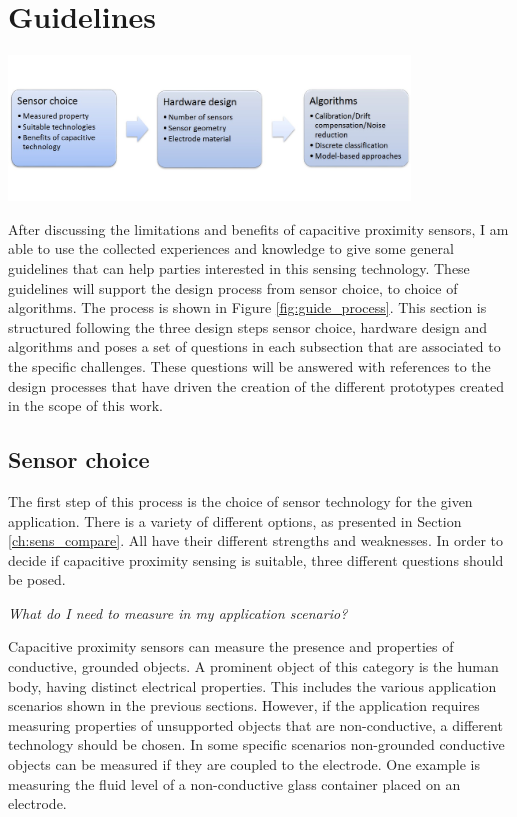 \section{Guidelines}
\begin{minipage}{\linewidth}
\centering
\includegraphics[width=0.8\textwidth]{images/guide_process}
\label{fig:guide_process}
\end{minipage}

After discussing the limitations and benefits of capacitive proximity sensors, I am able to use the collected experiences and knowledge to give some general guidelines that can help parties interested in this sensing technology. These guidelines will support the design process from sensor choice, to choice of algorithms. The process is shown in Figure \ref{fig:guide_process}. This section is structured following the three design steps sensor choice, hardware design and algorithms and poses a set of questions in each subsection that are associated to the specific challenges. These questions will be answered with references to the design processes that have driven the creation of the different prototypes created in the scope of this work.
 
\subsection{Sensor choice}
The first step of this process is the choice of sensor technology for the given application. There is a variety of different options, as presented in Section \ref{ch:sens_compare}. All have their different strengths and weaknesses. In order to decide if capacitive proximity sensing is suitable, three different questions should be posed.

\textit{What do I need to measure in my application scenario?
}

Capacitive proximity sensors can measure the presence and properties of conductive, grounded objects. A prominent object of this category is the human body, having distinct electrical properties. This includes the various application scenarios shown in the previous sections. However, if the application requires measuring properties of unsupported objects that are non-conductive, a different technology should be chosen. In some specific scenarios non-grounded conductive objects can be measured if they are coupled to the electrode. One example is measuring the fluid level of a non-conductive glass container placed on an electrode.

